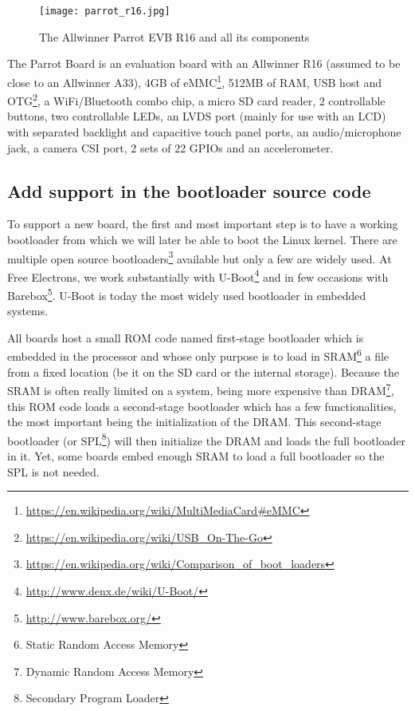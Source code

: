 \begin{figure}[H]
  \texttt{[image: parrot\_r16.jpg]}
  \caption{The Allwinner Parrot EVB R16 and all its components}
\end{figure}

The Parrot Board is an evaluation board with an Allwinner R16 (assumed to be close to an Allwinner A33), 4GB of eMMC\footnote{\url{https://en.wikipedia.org/wiki/MultiMediaCard\#eMMC}}, 512MB of RAM, USB host and OTG\footnote{\url{https://en.wikipedia.org/wiki/USB\_On-The-Go}}, a WiFi/Bluetooth combo chip, a micro SD card reader, 2 controllable buttons, two controllable LEDs, an LVDS port (mainly for use with an LCD) with separated backlight and capacitive touch panel ports, an audio/microphone jack, a camera CSI port, 2 sets of 22 GPIOs and an accelerometer.

\subsection{Add support in the bootloader source code}
To support a new board, the first and most important step is to have a working bootloader from which we will later be able to boot the Linux kernel. There are multiple open source bootloaders\footnote{\url{https://en.wikipedia.org/wiki/Comparison\_of\_boot\_loaders}} available but only a few are widely used. At Free Electrons, we work substantially with U-Boot\footnote{\url{http://www.denx.de/wiki/U-Boot/}} and in few occasions with Barebox\footnote{\url{http://www.barebox.org/}}. U-Boot is today the most widely used bootloader in embedded systems.

All boards host a small ROM code named first-stage bootloader which is embedded in the processor and whose only purpose is to load in SRAM\footnote{Static Random Access Memory} a file from a fixed location (be it on the SD card or the internal storage). Because the SRAM is often really limited on a system, being more expensive than DRAM\footnote{Dynamic Random Access Memory}, this ROM code loads a second-stage bootloader which has a few functionalities, the most important being the initialization of the DRAM. This second-stage bootloader (or SPL\footnote{Secondary Program Loader}) will then initialize the DRAM and loads the full bootloader in it. Yet, some boards embed enough SRAM to load a full bootloader so the SPL is not needed.

